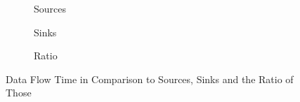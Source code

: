 \documentclass[../draft.tex]{subfiles}
\begin{document}
    \begin{figure}
        \centering
        \begin{subfigure}[b]{\textwidth}
            \centering
            \begin{subfigure}[]{0.45\textwidth}
                \centering
                \resizebox{\columnwidth}{!}{
                    
                }
            \end{subfigure}
            \qquad
            \begin{subfigure}[]{0.45\textwidth}
                \centering
                \resizebox{\columnwidth}{!}{
                    
                }
            \end{subfigure}
            \caption{Sources}
            \label{f:dfsources}
        \end{subfigure}
        \bigbreak
        \begin{subfigure}[b]{\textwidth}
            \centering
            \begin{subfigure}[]{0.45\textwidth}
                \centering
                \resizebox{\columnwidth}{!}{
                    
                }
            \end{subfigure}
            \qquad
            \begin{subfigure}[]{0.45\textwidth}
                \centering
                \resizebox{\columnwidth}{!}{
                    
                }
            \end{subfigure}
            \caption{Sinks}
            \label{f:dfsinks}
        \end{subfigure}
        \bigbreak
        \begin{subfigure}[b]{\textwidth}
            \centering
            \begin{subfigure}[]{0.45\textwidth}
                \centering
                \resizebox{\columnwidth}{!}{
                    
                }
            \end{subfigure}
            \qquad
            \begin{subfigure}[]{0.45\textwidth}
                \centering
                \resizebox{\columnwidth}{!}{
                    
                }
            \end{subfigure}
            \caption{Ratio}
            \label{f:dfratio}
        \end{subfigure}
        \caption{Data Flow Time in Comparison to Sources, Sinks and the Ratio of Those}
        \label{f:dftoss}
    \end{figure}
\end{document}
